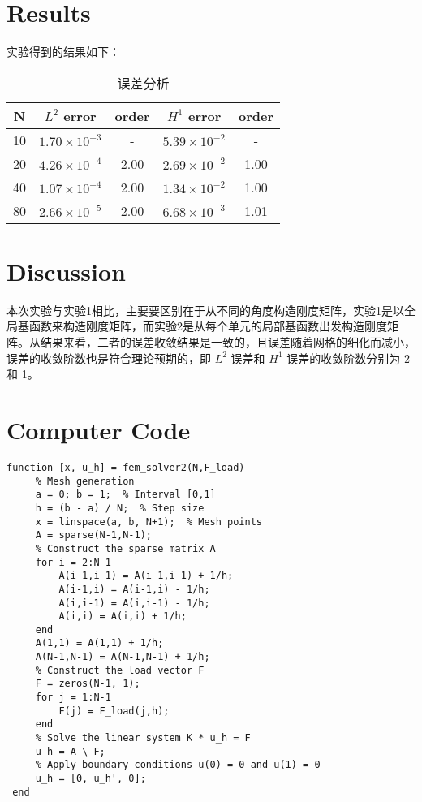 \documentclass[11pt]{ctexart}
\begin{document}
\section{Results}
实验得到的结果如下：
\begin{table}[htbp]
	\centering
	\caption{误差分析}
	  \begin{tabular}{|c|cc|cc|}
	  \toprule
	  N     & \multicolumn{1}{c}{$L^2$ error} & \multicolumn{1}{c|}{order} & \multicolumn{1}{c}{$H^1$ error} & \multicolumn{1}{c|}{order} \\
	  \midrule
	  10    & $1.70\times 10^{-3}$ &   -    & $5.39\times 10^{-2}$ & - \\
	  20    & $4.26\times 10^{-4}$ & 2.00 & $2.69\times 10^{-2}$ & 1.00 \\
	  40    & $1.07\times 10^{-4}$ & 2.00 & $1.34\times 10^{-2}$ & 1.00 \\
	  80    & $2.66\times 10^{-5}$ & 2.00 & $6.68\times 10^{-3}$ & 1.01 \\
	  \bottomrule
	  \end{tabular}%
	\label{tab:error}%
  \end{table}%

\section{Discussion}
本次实验与实验1相比，主要要区别在于从不同的角度构造刚度矩阵，实验1是以全局基函数来构造刚度矩阵，而实验2是从每个单元的局部基函数出发构造刚度矩阵。从结果来看，二者的误差收敛结果是一致的，且误差随着网格的细化而减小，误差的收敛阶数也是符合理论预期的，即 $ L^2 $ 误差和 $ H^1 $ 误差的收敛阶数分别为 2 和 1。

\appendix
\section{Computer Code}
\begin{lstlisting}[caption={FEM Solver}]
     function [x, u_h] = fem_solver2(N,F_load)
     % Mesh generation
     a = 0; b = 1;  % Interval [0,1]
     h = (b - a) / N;  % Step size
     x = linspace(a, b, N+1);  % Mesh points
     A = sparse(N-1,N-1);
     % Construct the sparse matrix A
     for i = 2:N-1
         A(i-1,i-1) = A(i-1,i-1) + 1/h;
         A(i-1,i) = A(i-1,i) - 1/h;
         A(i,i-1) = A(i,i-1) - 1/h;
         A(i,i) = A(i,i) + 1/h;
     end
     A(1,1) = A(1,1) + 1/h;
     A(N-1,N-1) = A(N-1,N-1) + 1/h;
     % Construct the load vector F
     F = zeros(N-1, 1);
     for j = 1:N-1
         F(j) = F_load(j,h);
     end
     % Solve the linear system K * u_h = F
     u_h = A \ F;
     % Apply boundary conditions u(0) = 0 and u(1) = 0
     u_h = [0, u_h', 0];
 end 
\end{lstlisting}
\end{document}
